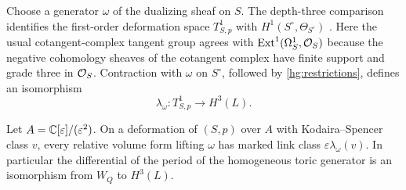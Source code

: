 Choose a generator $\omega$ of the dualizing sheaf on $S$. The
depth-three comparison identifies the first-order deformation space
$T^1_{S,p}$ with $H^1(S^\circ,\Theta_{S^\circ})$
\cite[Lemma~1.17 and Remark~4.2]{FL}. Here the usual cotangent-complex
tangent group agrees with $\operatorname{Ext}^1(\Omega^1_S,\mathcal O_S)$ because the negative
cohomology sheaves of the cotangent complex have finite support and
grade three in $\mathcal O_S$. Contraction with $\omega$ on
$S^\circ$, followed by \eqref{hg:restrictions}, defines an isomorphism
\begin{equation}\label{hg:lambda}
 \lambda_\omega:T^1_{S,p}\longrightarrow H^3(L).
\end{equation}

\begin{proposition}\label{prop:variation}
Let $A=\mathbb C[\varepsilon]/(\varepsilon^2)$. On a deformation of $(S,p)$
over $A$ with Kodaira--Spencer class $v$, every relative volume form
lifting $\omega$ has marked link class
$\varepsilon\lambda_\omega(v)$. In particular the differential of the
period of the homogeneous toric generator is an isomorphism from
$W_Q$ to $H^3(L)$.
\end{proposition}

